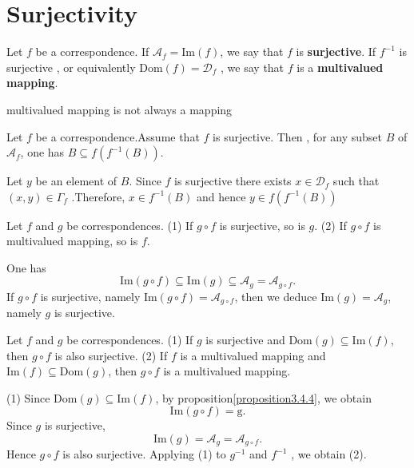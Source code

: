 \section{Surjectivity}
\begin{definitionenv}
    Let $f$ be a correspondence. If $\mathscr{A}_f=\mathrm{Im}(f)$,  we say that $f$ is \textbf{surjective}. If $f^{-1}$ is surjective ,  or equivalently $\mathrm{Dom}(f)=\mathscr{D}_f$ ,  we say that $f$ is a \textbf{multivalued mapping}.
\end{definitionenv}
\begin{remark}
    multivalued mapping is not always a mapping
\end{remark}
\begin{propositionenv}\label{proposition3.5.1}
    Let $f$ be a correspondence.Assume that $f$ is surjective. Then , for any subset $B$ of $\mathscr{A}_f$,  one has $B\subseteq f(f^{-1}(B))$.
\end{propositionenv}
\begin{proofenv}
    Let $y$ be an element of $B$. Since $f$ is surjective there exists $x\in \mathscr{D}_f$ such that $(x, y)\in \Gamma_f$ .Therefore,  $x\in f^{-1}(B)$ and hence $y\in f(f^{-1}(B))$
\end{proofenv}
\begin{propositionenv}\label{proposition3.5.2}
    Let $f$ and $g$ be correspondences.
    \newline
    (1) If $g\circ f$ is surjective,  so is $g$.
    \newline
    (2) If $g\circ f$ is multivalued mapping,  so is $f$.
\end{propositionenv}
\begin{proofenv}
    One has 
    $$\mathrm{Im}(g\circ f)\subseteq \mathrm{Im}(g)\subseteq \mathscr{A}_g=\mathscr{A}_{g\circ f}.$$
    If $g\circ f $ is surjective,  namely $\mathrm{Im}(g\circ f )=\mathscr{A}_{g\circ f}$,  then we deduce $\mathrm{Im}(g)=\mathscr{A}_g$,  namely $g$ is surjective.
\end{proofenv}
\begin{propositionenv}\label{proposition3.5.3}
    Let $f$ and $g$ be correspondences.
    \newline
    (1) If $g$ is surjective and $\mathrm{Dom}(g)\subseteq \mathrm{Im}(f)$, then $g\circ f $ is also surjective.
    \newline
    (2) If $f$ is a multivalued mapping and $\mathrm{Im}(f)\subseteq \mathrm{Dom}(g)$,  then $g\circ f $ is a multivalued mapping.
\end{propositionenv}
\begin{proofenv}
    (1) Since $\mathrm{Dom}(g)\subseteq \mathrm{Im}(f)$, by proposition\ref{proposition3.4.4}, we obtain 
    $$\mathrm{Im}(g\circ f )=\mathrm{g}.$$
    Since $g$ is surjective, 
    $$\mathrm{Im}(g)=\mathscr{A}_g=\mathscr{A}_{g\circ f}.$$
    Hence $g\circ f $ is also surjective.
    \newline
    Applying (1) to $g^{-1}$ and $f^{-1}$ , we obtain (2).
\end{proofenv}

